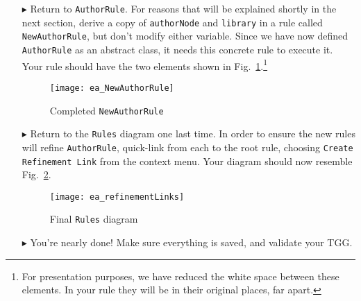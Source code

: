 \begin{itemize}
\item[$\blacktriangleright$] Return to \texttt{AuthorRule}. For reasons that will be explained shortly in the next section, derive a copy of \texttt{authorNode}
and \texttt{library} in a rule called \texttt{NewAuthorRule}, but don't modify either variable. Since we have now defined \texttt{AuthorRule} as an abstract
class, it needs this concrete rule to execute it. Your rule should have the two elements shown in Fig.~\ref{ea:NewAuthorRule}.\footnote{For presentation
purposes, we have reduced the white space between these elements. In your rule they will be in their original places, far apart.}

\vspace{0.5cm}

\begin{figure}[htbp]
\begin{center}
  \texttt{[image: ea\_NewAuthorRule]}
  \caption{Completed \texttt{NewAuthorRule}}
  \label{ea:NewAuthorRule}
\end{center}
\end{figure}

\item[$\blacktriangleright$] Return to the \texttt{Rules} diagram one last time. In order to ensure the new rules will refine \texttt{AuthorRule},
quick-link from each to the root rule, choosing \texttt{Create Refinement Link} from the context menu. Your diagram should now resemble
Fig.~\ref{ea:refinementClasses}.

\vspace{0.5cm}

\begin{figure}[htbp]
\begin{center}
  \texttt{[image: ea\_refinementLinks]}
  \caption{Final \texttt{Rules} diagram}
  \label{ea:refinementClasses}
\end{center}
\end{figure}


\item[$\blacktriangleright$] You're nearly done! Make sure everything is saved, and validate your TGG. 



\end{itemize}
